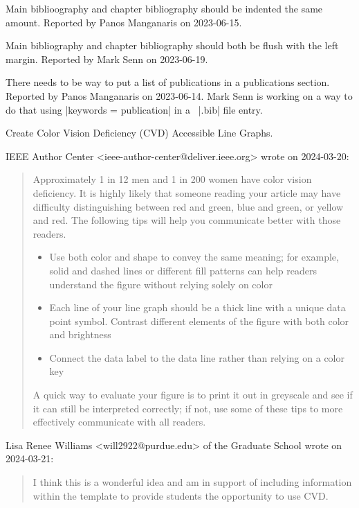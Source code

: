 Main biblioography and chapter bibliography should be indented the same amount.
{\small
  Reported by Panos Manganaris on 2023-06-15.%
}

Main bibliography and chapter bibliography should both be flush with the left margin.
{\small
  Reported by Mark Senn on 2023-06-19.%
}

There needs to be way to put a list of publications in a publications section.
{\small
  Reported by Panos Manganaris on 2023-06-14.  %
  Mark Senn is working on a way to do that
  using
  |keywords = {publication}|
  in a \BibLaTeXLogo\ |.bib| file entry.
}

Create Color Vision Deficiency (CVD) Accessible Line Graphs.\\
{\small
  IEEE Author Center <ieee-author-center@deliver.ieee.org> wrote on 2024-03-20:
  \begin{quote}
    Approximately 1 in 12 men
    and 1 in 200 women
    have color vision deficiency.
    It is highly likely
    that someone reading your article
    may have difficulty distinguishing between red and green,
    blue and green,
    or yellow and red.
    The following tips will help you communicate better with those readers.
    \begin{itemize}
      \item
        Use both color and shape to convey the same meaning;
        for example,
        solid and dashed lines
        or different fill patterns can help readers understand the figure
        without relying solely on color
      \item
        Each line of your line graph
        should be a thick line with a unique data point symbol.
        Contrast different elements of the figure with both color and brightness
      \item
        Connect the data label
        to the data line
        rather than relying on a color key
    \end{itemize}
    A quick way to evaluate your figure is to print it out in greyscale
    and see if it can still be interpreted correctly;
    if not,
    use some of these tips to more effectively communicate with all readers.
  \end{quote}
  Lisa Renee Williams <will2922@purdue.edu> of the Graduate School wrote on 2024-03-21:
  \begin{quote}
    I think this is a wonderful idea and am in support of including information
    within the template to provide students the opportunity to use CVD.
  \end{quote}
}

